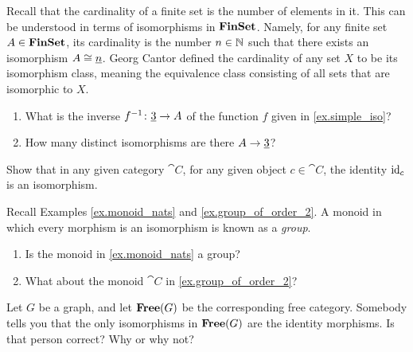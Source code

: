 \documentclass[7Sketches]{subfiles}
\begin{document}
Recall that the cardinality of a finite set is the number of elements in it. This can be understood in terms of isomorphisms in $\mathbf{FinSet}$. Namely, for any finite set $A\in\mathbf{FinSet}$, its cardinality is the number $n\in\mathbb{N}$ such that there exists an isomorphism $A\cong\underline{{n}}$.%
 Georg Cantor defined the cardinality of any set $X$ to be its isomorphism class, meaning the equivalence class consisting of all sets that are isomorphic to $X$. 

\begin{exercise}%
\label{exc.iso_practice}
\begin{enumerate}
	\item What is the inverse $f^{-1}\colon\underline{{3}}\to A$ of the function $f$ given in \cref{ex.simple_iso}?
	\item How many distinct isomorphisms are there $A\to\underline{{3}}$?
	\qedhere
\end{enumerate}
\end{exercise}


\begin{exercise}%
\label{exc.id_iso}
Show that in any given category $\cat{C}$, for any given object $c\in\cat{C}$, the identity $\mathrm{id}_c$ is an isomorphism.
\end{exercise}

\begin{exercise}%
\label{exc.monoid_group}%
%
Recall Examples \ref{ex.monoid_nats} and \ref{ex.group_of_order_2}. A monoid in
which every morphism is an isomorphism is known as a \emph{group}. 
\begin{enumerate}
  \item Is the monoid in \cref{ex.monoid_nats} a group?
  \item What about the monoid $\cat{C}$ in \cref{ex.group_of_order_2}?
  \qedhere
\end{enumerate}
\end{exercise}


\begin{exercise}%
%
\label{exc.iso_free_cat}
Let $G$ be a graph, and let $\mathbf{Free}(G)$ be the corresponding free category. Somebody tells you that the only isomorphisms in $\mathbf{Free}(G)$ are the identity morphisms. Is that person correct? Why or why not?
\end{exercise}
\end{document}
